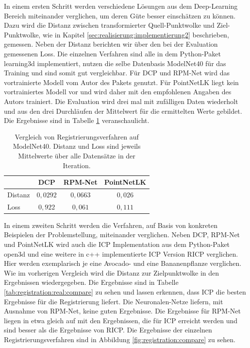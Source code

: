 \documentclass[12pt,titlepage, twoside]{article}
\begin{document}
In einem ersten Schritt werden verschiedene Lösungen aus dem Deep-Learning Bereich miteinander verglichen, um deren Güte besser einschätzen zu können.
Dazu wird die Distanz zwischen transformierter Quell-Punktwolke und Ziel-Punktwolke, wie in Kapitel \ref{sec:realisierung:implementierung2} beschrieben, gemessen. 
Neben der Distanz berichten wir über den bei der Evaluation gemessenen Loss.
Die einzelnen Verfahren sind alle in dem Python-Paket learning3d \cite{learning3d} implementiert, nutzen die selbe Datenbasis ModelNet40 für das Training und sind somit gut vergleichbar. 
Für DCP und RPM-Net wird das vortrainierte Modell vom Autor des Pakets genutzt.
Für PointNetLK liegt kein vortrainiertes Modell vor und wird daher mit den empfohlenen Angaben des Autors trainiert. 
Die Evaluation wird drei mal mit zufälligen Daten wiederholt und aus den drei Durchläufen der Mittelwert für die ermittelten Werte gebildet.
Die Ergebnisse sind in Tabelle \ref{tab:registration:deeplearn:compare} veranschaulicht.

\begin{table}
\begin{center}
\begin{tabular}{|l || c | c | c | } 
    \hline
     & DCP & RPM-Net & PointNetLK \\  
    \hline
    \hline
    Distanz & $0,0292$ & $0,0663$& $0,026$\\
    \hline
    Loss & $0,922$& $0,061$& $0,111$\\
    \hline
\end{tabular}
\end{center}
\caption{Vergleich von Registrierungsverfahren auf ModelNet40. Distanz und Loss sind jeweils Mittelwerte über alle Datensätze in der Iteration.}
\label{tab:registration:deeplearn:compare}
\end{table}

In einem zweiten Schritt werden die Verfahren, auf Basis von konkreten Beispielen der Problemstellung, miteinander verglichen. 
Neben DCP, RPM-Net und PointNetLK wird auch die ICP Implementation aus dem Python-Paket open3d \cite{zhou2018open3d} und eine weitere in c++ implementierte ICP Version RICP verglichen.
Hier werden exemplarisch je eine Avocado- und eine Bananenpflanze verglichen. Wie im vorherigen Vergleich wird die Distanz zur Zielpunktwolke in den Ergebnissen wiedergegeben.
Die Ergebnisse sind in Tabelle \ref{tab:registration:real:compare} zu sehen und lassen erkennen, dass ICP die besten Ergebnisse für die Registrierung liefert. 
Die Neuronalen-Netze liefern, mit Ausnahme von RPM-Net, keine guten Ergebnisse. 
Die Ergebnisse für RPM-Net liegen in etwa gleich auf mit den Ergebnissen, die für ICP erreicht werden und sind besser als die Ergebnisse von RICP. Die Ergebnisse der einzelnen Registrierungsverfahren sind in Abbildung \ref{fig:registration:compare} zu sehen.
\end{document}
